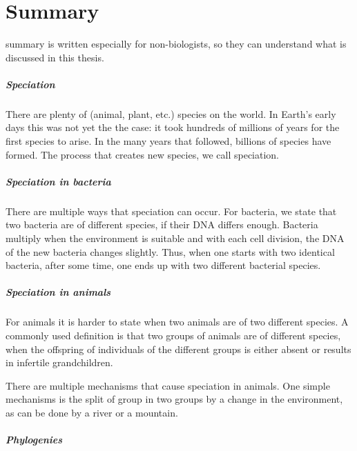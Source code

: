 \chapter*{Summary}

\noindent 
{} summary is written especially for
non-biologists, so they can understand what is
discussed in this thesis.

\paragraph{Speciation}

There are plenty of (animal, plant, etc.) species on the world.
In Earth's early days this was not yet the the case:
it took hundreds of millions of years for the first species to arise.
In the many years that followed, billions of species have formed.
The process that creates new species, we call speciation.

\paragraph{Speciation in bacteria}

There are multiple ways that speciation can occur.
For bacteria, we state that two bacteria are of different species,
if their DNA differs enough. Bacteria multiply when the 
environment is suitable and with each cell division, the DNA
of the new bacteria changes slightly. 
Thus, when one starts with two identical bacteria, 
after some time, one
ends up with two different bacterial species.

\paragraph{Speciation in animals}

For animals it is harder to state when two animals are of two 
different species. A commonly used definition is that two groups
of animals are of different species, when the offspring 
of individuals of the different groups is either absent 
or results in infertile grandchildren.

There are multiple mechanisms that cause speciation in animals.
One simple mechanisms is the split of group in two groups
by a change in the environment, as can be done by a river
or a mountain.

\paragraph{Phylogenies}

